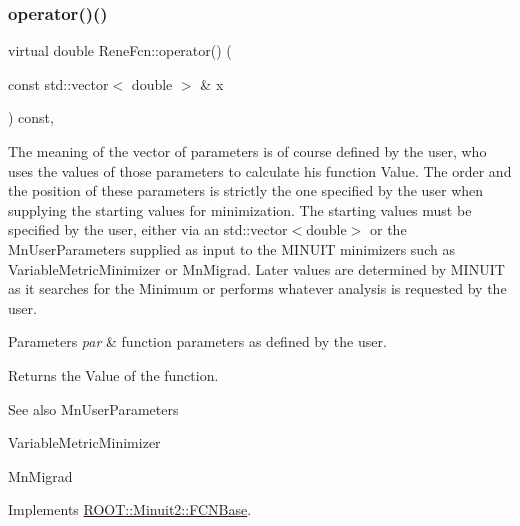 \mbox{\label{classReneFcn_a717a787ca09d586430bf5dc1d51b7ab1}} 
\subsubsection{\texorpdfstring{operator()()}{operator()()}\hspace{0.1cm}{\footnotesize\ttfamily [2/2]}}
{\footnotesize\ttfamily virtual double Rene\+Fcn\+::operator() (\begin{DoxyParamCaption}\item[{const std\+::vector$<$ double $>$ \&}]{x }\end{DoxyParamCaption}) const\hspace{0.3cm}{\ttfamily [inline]}, {\ttfamily [virtual]}}

The meaning of the vector of parameters is of course defined by the user, who uses the values of those parameters to calculate his function Value. The order and the position of these parameters is strictly the one specified by the user when supplying the starting values for minimization. The starting values must be specified by the user, either via an std\+::vector$<$double$>$ or the Mn\+User\+Parameters supplied as input to the M\+I\+N\+U\+IT minimizers such as Variable\+Metric\+Minimizer or Mn\+Migrad. Later values are determined by M\+I\+N\+U\+IT as it searches for the Minimum or performs whatever analysis is requested by the user.


\begin{DoxyParams}{Parameters}
{\em par} & function parameters as defined by the user.\\
\hline
\end{DoxyParams}
\begin{DoxyReturn}{Returns}
the Value of the function.
\end{DoxyReturn}
\begin{DoxySeeAlso}{See also}
Mn\+User\+Parameters 

Variable\+Metric\+Minimizer 

Mn\+Migrad 
\end{DoxySeeAlso}


Implements \mbox{\hyperlink{classROOT_1_1Minuit2_1_1FCNBase_ae4a86bd94d0d0f5ca6fc8f8ab2bb43cd}{R\+O\+O\+T\+::\+Minuit2\+::\+F\+C\+N\+Base}}.

\mbox{\label{classReneFcn_a5e7e439a47c37d673d9366918c74239c}} 
